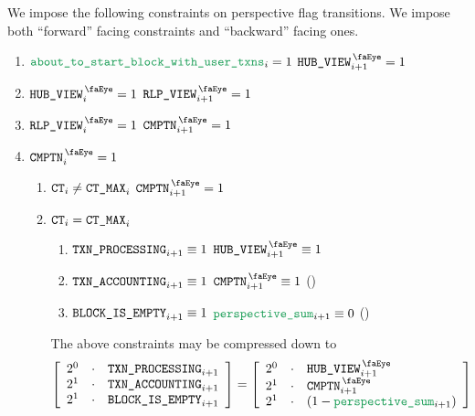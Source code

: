 We impose the following constraints on perspective flag transitions.
We impose both
``forward''  facing constraints and
``backward'' facing ones.
\begin{enumerate}
	\item \If $\aboutToStartBlockWithUserTransactions _{i} = 1$ \Then $\isUserTxnHubView _{i + 1} = 1$
	\item \If $\isUserTxnHubView     _{i} = 1$ \Then $\isUserTxnRlpView     _{i + 1} = 1$
	\item \If $\isUserTxnRlpView     _{i} = 1$ \Then $\isUserTxnComputation _{i + 1} = 1$
	\item \If $\isUserTxnComputation _{i} = 1$ \Then
		\begin{enumerate}
			\item \If $\texttt{CT} _{i} \neq \texttt{CT\_MAX} _{i}$ \Then $\isUserTxnComputation _{i + 1} = 1$
			\item \If $\texttt{CT} _{i} =    \texttt{CT\_MAX} _{i}$ \Then
				\begin{enumerate}
					\item \If $\texttt{TXN\_PROCESSING} _{i + 1} \equiv 1$ \Then $\isUserTxnHubView     _{i + 1} \equiv 1$
					\item \If $\texttt{TXN\_ACCOUNTING} _{i + 1} \equiv 1$ \Then $\isUserTxnComputation _{i + 1} \equiv 1$ (\sanityCheck)
					\item \If $\texttt{BLOCK\_IS\_EMPTY}    _{i + 1} \equiv 1$ \Then $\perspectiveSum       _{i + 1} \equiv 0$ (\sanityCheck)
				\end{enumerate}
				\saNote{}
				The above constraints may be compressed down to
				\[
					\left[ \begin{array}{rcl}
						2^{0} & \cdot & \transactionProcessing _{i + 1} \\
						2^{1} & \cdot & \transactionAccounting _{i + 1} \\
						2^{1} & \cdot & \blockIsEmpty    _{i + 1} \\
					\end{array} \right]
					=
					\left[ \begin{array}{rcl}
						2^{0} & \cdot & \isUserTxnHubView     _{i + 1}       \\
						2^{1} & \cdot & \isUserTxnComputation _{i + 1}       \\
						2^{1} & \cdot & (1 - \perspectiveSum  _{i + 1}) \\
					\end{array} \right]
				\]
		\end{enumerate}
\end{enumerate}
